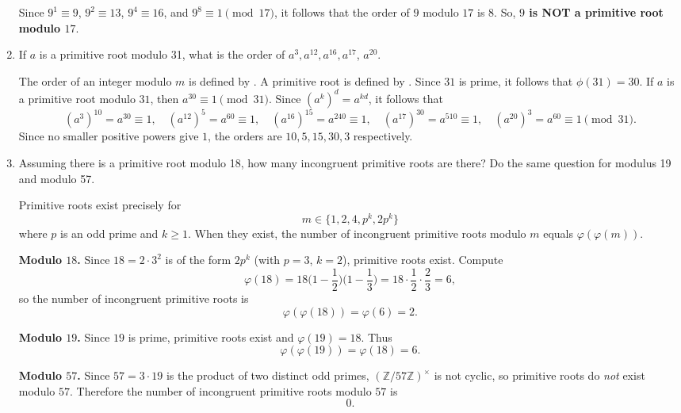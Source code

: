 \begin{enumerate}
\begin{subanswer}
    Since $9^1 \equiv 9$, $9^2 \equiv 13$, $9^4 \equiv 16$, and $9^8 \equiv 1 \pmod{17}$, 
    it follows that the order of $9$ modulo $17$ is $8$. So, \textbf{$9$ is NOT a primitive root modulo $17$}.
  \end{subanswer}
  \item If $a$ is a primitive root modulo 31, what is the order of $a^{3}, a^{12}, a^{16}, a^{17}$, $a^{20}$.
  \begin{subanswer}
    The order of an integer modulo $m$ is defined by .
    A primitive root is defined by .
    Since $31$ is prime, it follows that $\phi(31) = 30$.
    If $a$ is a primitive root modulo $31$, then $a^{30} \equiv 1 \pmod{31}$.
    Since $(a^k)^d = a^{kd}$, it follows that
    \[
    (a^3)^{10} = a^{30} \equiv 1, \quad (a^{12})^5 = a^{60} \equiv 1, \quad (a^{16})^{15} = a^{240} \equiv 1, \quad (a^{17})^{30} = a^{510} \equiv 1, \quad (a^{20})^3 = a^{60} \equiv 1 \pmod{31}.
    \]
    Since no smaller positive powers give $1$, the orders are $10, 5, 15, 30, 3$ respectively.
  \end{subanswer}
  
  \item Assuming there is a primitive root modulo 18, how many incongruent primitive roots are there? Do the same question for modulus 19 and modulo 57.
  \begin{subanswer}
    Primitive roots exist precisely for
    \[
    m\in\{1,2,4, p^k,2p^k\}
    \]
    where \(p\) is an odd prime and \(k\ge1\). When they exist, the number of incongruent primitive roots modulo \(m\) equals \(\varphi(\varphi(m))\).
    
    \textbf{Modulo $18$.} Since \(18=2\cdot3^2\) is of the form \(2p^k\) (with \(p=3\), \(k=2\)), primitive roots exist. Compute
    \[
    \varphi(18)=18\Big(1-\frac{1}{2}\Big)\Big(1-\frac{1}{3}\Big)=18\cdot\frac{1}{2}\cdot\frac{2}{3}=6,
    \]
    so the number of incongruent primitive roots is
    \[
    \varphi(\varphi(18))=\varphi(6)=2.
    \]
    
    \textbf{Modulo $19$.} Since \(19\) is prime, primitive roots exist and \(\varphi(19)=18\). Thus
    \[
    \varphi(\varphi(19))=\varphi(18)=6.
    \]
    
    \textbf{Modulo $57$.} Since \(57=3\cdot19\) is the product of two distinct odd primes, \((\mathbb{Z}/57\mathbb{Z})^\times\) is not cyclic, so primitive roots do \emph{not} exist modulo \(57\). Therefore the number of incongruent primitive roots modulo \(57\) is
    \[
    0.
    \]
    \end{subanswer}
    

\end{enumerate}
